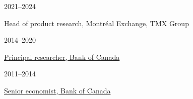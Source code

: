 \documentclass[11pt,letterpaper]{article}
\begin{document}
\smallskip

\noindent
\begin{minipage}[t]{0.15\textwidth}
2021--2024
\end{minipage}
\begin{minipage}[t]{0.80\textwidth}
Head of product research, Montr\'eal Exchange, TMX Group

\end{minipage}


\smallskip

\noindent
\begin{minipage}[t]{0.15\textwidth}
2014--2020 \end{minipage}
\begin{minipage}[t]{0.80\textwidth}
\href{https://www.bankofcanada.ca/profile/corey-garriott/}{Principal researcher, Bank of Canada}
\end{minipage}

\smallskip

\noindent
\begin{minipage}[t]{0.15\textwidth}
2011--2014
\end{minipage}
\begin{minipage}[t]{0.80\textwidth}
\href{https://www.bankofcanada.ca/profile/corey-garriott/}{Senior economist, Bank of Canada}
\end{minipage}

\end{document}
